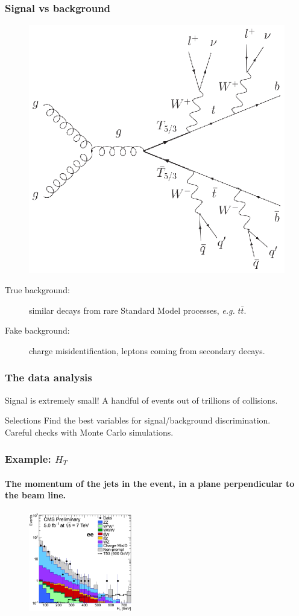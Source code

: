 \documentclass[ukenglish]{beamer}
\begin{document}
\begin{frame}
    \frametitle{Signal vs background}
    \begin{figure}[h]
        \centering
            \includegraphics[width=.4\textwidth]{toppartner_decay}
    \end{figure}
    \begin{description}
        \item[True background:] similar decays from rare Standard Model
            processes, \emph{e.g.} $t\bar t$.
        \item[Fake background:] charge misidentification, leptons coming
            from secondary decays.
    \end{description}
\end{frame}

\begin{frame}
    \frametitle{The data analysis}
    Signal is extremely small! A handful of events out 
    of trillions of collisions.
    \begin{block}
        {Selections}
        Find the best variables for signal/background discrimination.\\
        Careful checks with Monte Carlo simulations.
    \end{block}
\end{frame}

\begin{frame}
    \frametitle{Example: $H_T$}
    \framesubtitle{The momentum of the jets in the event, in a plane
    perpendicular to the beam line.}
    \begin{figure}[h]
        \centering
            \includegraphics[width=0.4\textwidth]{ht}
    \end{figure}
\end{frame}
\end{document}
